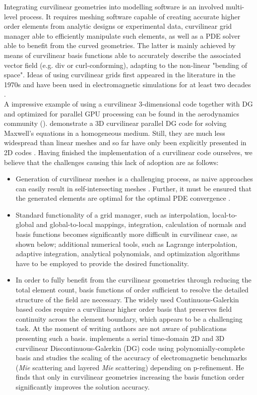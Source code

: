 
\noindent
Integrating curvilinear geometries into modelling software is an involved multi-level process. It requires meshing software capable of creating accurate higher order elements from analytic designs or experimental data, curvilinear grid manager able to efficiently manipulate such elements, as well as a PDE solver able to benefit from the curved geometries. The latter is mainly achieved by means of curvilinear basis functions able to accurately describe the associated vector field (e.g. div or curl-conforming), adapting to the non-linear "bending of space". Ideas of using curvilinear grids first appeared in the literature in the 1970s \citep{ciarlet+1972, lenoir1986} and have been used in electromagnetic simulations for at least two decades \citep{wang+1993}. \\

\noindent
A impressive example of using a curvilinear $3$-dimensional code together with DG and optimized for parallel GPU processing can be found in the aerodynamics community (\citeauthor{Warburton2012}).
\citeauthor{wang+2011} demonstrate a 3D curvilinear parallel DG code for solving Maxwell's equations in a homogeneous medium.
Still, they are much less widespread than linear meshes and so far have only been explicitly presented in 2D codes \citep{wang+2011a}.
Having finished the implementation of a curvilinear code ourselves, we believe that the challenges causing this lack of adoption are as follows:
\begin{itemize}
\item Generation of curvilinear meshes is a challenging process, as naive approaches can easily result in self-intersecting meshes \citep{toulorge+2013, johnen+2012}. Further, it must be ensured that the generated elements are optimal for the optimal PDE convergence \cite{lenoir1986}.
\item Standard functionality of a grid manager, such as interpolation, local-to-global and global-to-local mappings, integration, calculation of normals and basis functions becomes significantly more difficult in curvilinear case, as shown below; additional numerical tools, such as Lagrange interpolation, adaptive integration, analytical polynomials, and optimization algorithms have to be employed to provide the desired functionality. 
\item In order to fully benefit from the curvilinear geometries through reducing the total element count, basis functions of order sufficient to resolve the detailed structure of the field are necessary. The widely used Continuous-Galerkin based codes require a curvilinear higher order basis that preserves field continuity across the element boundary, which appears to be a challenging task. At the moment of writing authors are not aware of publications presenting such a basis. \citeauthor{fahs2011} implements a serial time-domain 2D and 3D curvilinear Discontinuous-Galerkin (DG) code using polynomially-complete basis and studies the scaling of the accuracy of electromagnetic benchmarks (\textit{Mie} scattering and layered \textit{Mie} scattering) depending on p-refinement. He finds that only in curvilinear geometries increasing the basis function order significantly improves the solution accuracy.
\end{itemize}

